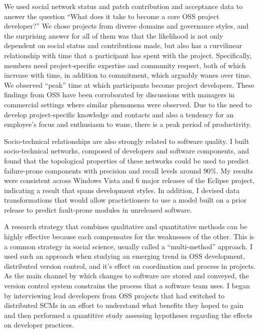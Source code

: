 \documentclass[10pt]{article}
\begin{document}
\begin{small}
We used social network status and patch contribution and acceptance data to
answer the question ``What does it take to become a core OSS project
developer?'' We chose projects from diverse domains and governance styles, and
the surprising answer for all of them was that the likelihood is not only
dependent on social status and contributions made, but also has a curvilinear
relationship with time that a participant has spent with the project.
Specifically, members need project-specific expertise and community respect,
both of which increase with time, in addition to commitment, which arguably
wanes over time.  We observed ``peak'' time at which participants become
project developers.  These findings from OSS have been corroborated by
discussions with managers in commercial settings where similar phenomena were
observed.  Due to the need to develop project-specific knowledge and contacts
and also a tendency for an employee's focus and enthusiasm to wane, there is a
peak period of productivity.

Socio-technical relationships are also strongly related to software quality.  I
built socio-technical networks, composed of developers and software components,
and found that the topological properties of these networks could be used to
predict failure-prone components with precision and recall levels around 90\%.
My results were consistent across Windows Vista and 6 major releases of the
Eclipse project, indicating a result that spans development styles.  In
addition, I devised data transformations that would allow practictioners to use
a model built on a prior release to predict fault-prone modules in unreleased
software.

A research strategy that combines qualitative and quantitative methods can be
highly effective because each compensates for the weaknesses of the other.
This is a common strategy in social science, usually called a ``multi-method''
approach.  I used such an approach when studying an emerging trend in
OSS development, distributed version control, and it's effect on coordination
and process in projects.  As the main channel by which changes to software are
stored and conveyed, the version control system constrains the process that a
software team uses.  I began by interviewing lead developers from OSS projects
that had switched to distributed SCMs in an effort to understand what benefits
they hoped to gain and then performed a quantitive study assessing hypotheses
regarding the effects on developer practices.


\end{small}
\end{document}
